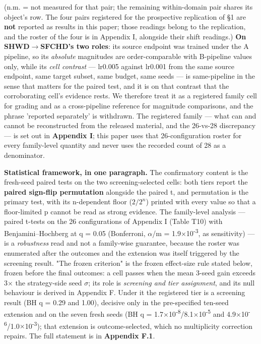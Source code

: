 \documentclass[pdflatex,sn-mathphys-ay]{sn-jnl}
\begin{document}
(n.m. = not measured for that pair; the remaining within-domain pair shares its object's row. The four pairs registered for the prospective replication of \S{}1 are \textbf{not} reported as results in this paper; those readings belong to the replication, and the roster of the four is in Appendix I, alongside their shift readings.) \textbf{On SHWD\ensuremath{\rightarrow}SFCHD's two roles}: its source endpoint was trained under the A pipeline, so its \emph{absolute} magnitudes are order-comparable with B-pipeline values only, while its \emph{cell contrast} --- lr0.005 against lr0.001 from the same source endpoint, same target subset, same budget, same seeds --- is same-pipeline in the sense that matters for the paired test, and it is on that contrast that the corroborating cell's evidence rests. We therefore treat it as a registered family cell for grading and as a cross-pipeline reference for magnitude comparisons, and the phrase 'reported separately' is withdrawn. The registered family --- what can and cannot be reconstructed from the released material, and the 26-vs-28 discrepancy --- is set out in \textbf{Appendix I}; this paper uses that 26-configuration roster for every family-level quantity and never uses the recorded count of 28 as a denominator.

\textbf{Statistical framework, in one paragraph.} The confirmatory content is the fresh-seed paired tests on the two screening-selected cells: both tiers report the \textbf{paired sign-flip permutation} alongside the paired t, and permutation is the primary test, with its n-dependent floor ($2/2^n$) printed with every value so that a floor-limited p cannot be read as strong evidence. The family-level analysis --- paired t-tests on the 26 configurations of Appendix I (Table T10) with Benjamini--Hochberg at q = 0.05 (Bonferroni, \ensuremath{\alpha}/m = 1.9\ensuremath{\times}10\textsuperscript{-3}, as sensitivity) --- is a \emph{robustness} read and not a family-wise guarantee, because the roster was enumerated after the outcomes and the extension was itself triggered by the screening result. "The frozen criterion" is the frozen effect-size rule stated below, frozen before the final outcomes: a cell passes when the mean 3-seed gain exceeds 3\ensuremath{\times} the strategy-side seed \ensuremath{\sigma}; its role is \emph{screening and tier assignment}, and its null behaviour is derived in Appendix F. Under it the registered tier is a screening result (BH q = 0.29 and 1.00), decisive only in the pre-specified ten-seed extension and on the seven fresh seeds (BH q = 1.7\ensuremath{\times}10\textsuperscript{-8}/8.1\ensuremath{\times}10\textsuperscript{-5} and 4.9\ensuremath{\times}10\textsuperscript{-6}/1.0\ensuremath{\times}10\textsuperscript{-3}); that extension is outcome-selected, which no multiplicity correction repairs. The full statement is in \textbf{Appendix F.1}.
\end{document}
